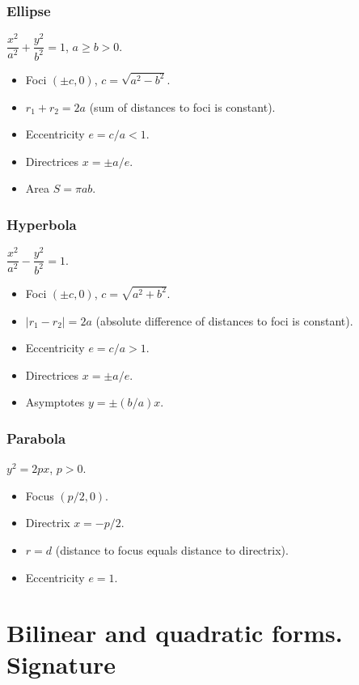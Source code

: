 \subsubsection{Ellipse}
\label{subsubsec:ellipse}

$\dfrac{x^2}{a^2}+\dfrac{y^2}{b^2}=1$, $a\ge b>0$.
\begin{itemize}
\item Foci $(\pm c,0)$, $c=\sqrt{a^2-b^2}$.
\item $r_1+r_2 = 2a$ (sum of distances to foci is constant).
\item Eccentricity $e=c/a<1$.
\item Directrices $x=\pm a/e$.
\item Area $S=\pi ab$.
\end{itemize}

\subsubsection{Hyperbola}
\label{subsubsec:hyperbola}

$\dfrac{x^2}{a^2}-\dfrac{y^2}{b^2}=1$.
\begin{itemize}
\item Foci $(\pm c,0)$, $c=\sqrt{a^2+b^2}$.
\item $|r_1-r_2| = 2a$ (absolute difference of distances to foci is constant).
\item Eccentricity $e=c/a>1$.
\item Directrices $x=\pm a/e$.
\item Asymptotes $y=\pm(b/a)x$.
\end{itemize}

\subsubsection{Parabola}
\label{subsubsec:parabola}

$y^2 = 2px$, $p>0$.
\begin{itemize}
\item Focus $(p/2,0)$.
\item Directrix $x=-p/2$.
\item $r = d$ (distance to focus equals distance to directrix).
\item Eccentricity $e=1$.
\end{itemize}

\medskip

\section{Bilinear and quadratic forms. Signature}
\label{sec:bilinear-forms}

